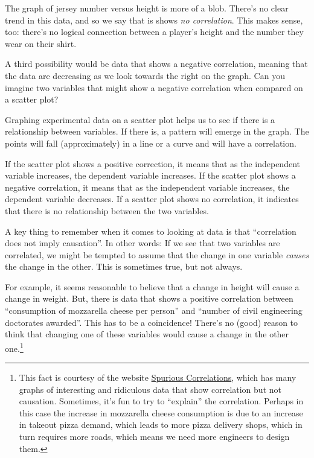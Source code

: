 The graph of jersey number versus height is more of a blob. There's no clear trend in this data, and so we say that is shows \textit{no correlation}. This makes sense, too: there's no logical connection between a player's height and the number they wear on their shirt.

A third possibility would be data that shows a negative correlation, meaning that the data are decreasing as we look towards the right on the graph. Can you imagine two variables that might show a negative correlation when compared on a scatter plot?

Graphing experimental data on a scatter plot helps us to see if there is a relationship between variables. If there is, a pattern will emerge in the graph. The points will fall (approximately) in a line or a curve and will have a correlation.

If the scatter plot shows a positive correction, it means that as the independent variable increases, the dependent variable increases. If the scatter plot shows a negative correlation, it means that as the independent variable increases, the dependent variable decreases. If a scatter plot shows no correlation, it indicates that there is no relationship between the two variables.

A key thing to remember when it comes to looking at data is that ``correlation does not imply causation''. In other words: If we see that two variables are correlated, we might be tempted to assume that the change in one variable \textit{causes} the change in the other. This is sometimes true, but not always.

For example, it seems reasonable to believe that a change in height will cause a change in weight. But, there is data that shows a positive correlation between ``consumption of mozzarella cheese per person'' and ``number of civil engineering doctorates awarded''. This has to be a coincidence! There's no (good) reason to think that changing one of these variables would cause a change in the other one.\footnote{This fact is courtesy of the website \href{http://www.tylervigen.com/view_correlation?id=3890}{Spurious Correlations}, which has many graphs of interesting and ridiculous data that show correlation but not causation. Sometimes, it's fun to try to ``explain'' the correlation. Perhaps in this case the increase in mozzarella cheese consumption is due to an increase in takeout pizza demand, which leads to more pizza delivery shops, which in turn requires more roads, which means we need more engineers to design them.}

